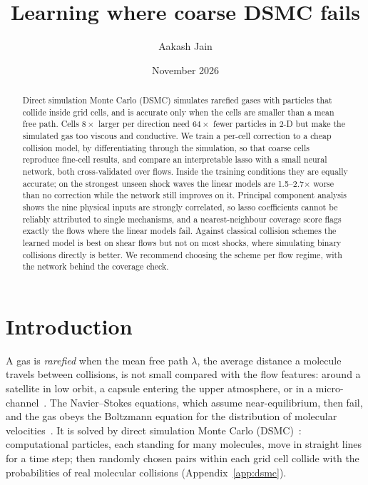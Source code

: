 \documentclass[10pt]{article}
\title{Learning where coarse DSMC fails}
\author{Aakash Jain}
\date{November 2026}
\begin{document}
\maketitle

\begin{abstract}
Direct simulation Monte Carlo (DSMC) simulates rarefied gases with particles that collide inside
grid cells, and is accurate only when the cells are smaller than a mean free path. Cells
$8\times$ larger per direction need $64\times$ fewer particles in 2-D but make the simulated gas
too viscous and conductive. We train a per-cell correction to a cheap collision model, by
differentiating through the simulation, so that coarse cells reproduce fine-cell results, and
compare an interpretable lasso with a small neural network, both cross-validated over flows.
Inside the training conditions they are equally accurate; on the strongest unseen shock waves
the linear models are 1.5--2.7$\times$ worse than no correction while the network still improves
on it. Principal component analysis shows the nine physical inputs are strongly correlated, so lasso
coefficients cannot be reliably attributed to single mechanisms, and a nearest-neighbour
coverage score flags exactly the flows where the linear models fail. Against classical collision
schemes the learned model is best on shear flows but not on most shocks, where simulating binary
collisions directly is better. We recommend choosing the scheme per flow regime, with the network
behind the coverage check.
\end{abstract}

\section{Introduction}

A gas is \emph{rarefied} when the mean free path $\lambda$, the average distance a molecule
travels between collisions, is not small compared with the flow features: around a satellite in
low orbit, a capsule entering the upper atmosphere, or in a micro-channel~\citep{boyd2017,
karniadakis2005}. The Navier--Stokes equations, which assume near-equilibrium, then fail, and the
gas obeys the Boltzmann equation for the distribution of molecular velocities~\citep{cercignani1988}.
It is solved by direct simulation Monte Carlo (DSMC)~\citep{bird1994,plimpton2019}: computational
particles, each standing for many molecules, move in straight lines for a time step; then
randomly chosen pairs within each grid cell collide with the probabilities of real molecular
collisions (Appendix~\ref{app:dsmc}).
\end{document}
